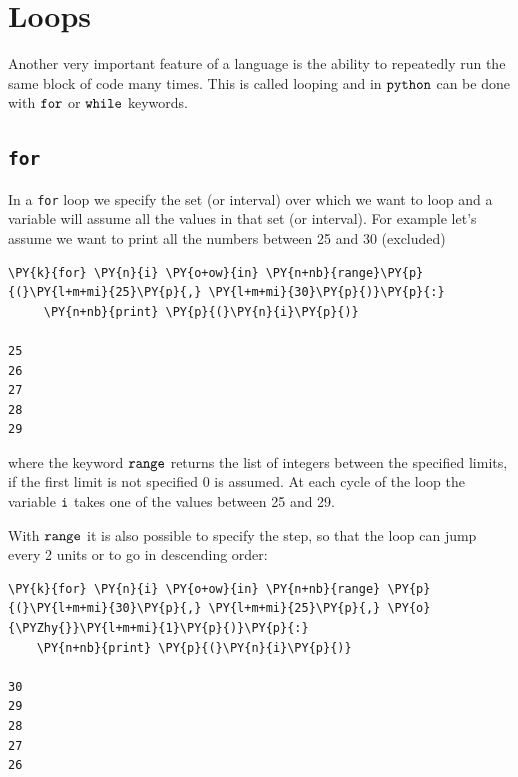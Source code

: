\section{Loops}\label{loops}

Another very important feature of a language is the ability to repeatedly run the same 
block of code many times. This is called looping and in \(\tt{python}\) can be done
 with $\tt{for}$ or $\tt{while}$ keywords.

\subsection{\texttt{for}}\label{for}

In a \texttt{for} loop we specify the set (or interval) over which we want to loop and a 
variable will assume all the values in that set (or interval). For example let's assume we 
want to print all the numbers between 25 and 30 (excluded) 

\begin{codebox}[breakable, size=fbox, boxrule=1pt, pad at break*=1mm, colback=cellbackground, colframe=cellborder]            
\begin{Verbatim}[commandchars=\\\{\}]
\PY{k}{for} \PY{n}{i} \PY{o+ow}{in} \PY{n+nb}{range}\PY{p}{(}\PY{l+m+mi}{25}\PY{p}{,} \PY{l+m+mi}{30}\PY{p}{)}\PY{p}{:}
     \PY{n+nb}{print} \PY{p}{(}\PY{n}{i}\PY{p}{)}

25
26
27
28
29
\end{Verbatim}
\end{codebox}
\noindent
where the keyword $\tt{range}$ returns the list of integers between the specified limits, 
if the first limit is not specified 0 is assumed.
At each cycle of the loop the variable $\tt{i}$ takes one of the values between
25 and 29. 

With $\tt{range}$ it is also possible to specify the step, so that the loop can jump every 2 units or to go in descending order:

\begin{codebox}[breakable, size=fbox, boxrule=1pt, pad at break*=1mm, colback=cellbackground, colframe=cellborder]            
\begin{Verbatim}[commandchars=\\\{\}]
\PY{k}{for} \PY{n}{i} \PY{o+ow}{in} \PY{n+nb}{range} \PY{p}{(}\PY{l+m+mi}{30}\PY{p}{,} \PY{l+m+mi}{25}\PY{p}{,} \PY{o}{\PYZhy{}}\PY{l+m+mi}{1}\PY{p}{)}\PY{p}{:}
    \PY{n+nb}{print} \PY{p}{(}\PY{n}{i}\PY{p}{)}

30
29
28
27
26
\end{Verbatim}
\end{codebox}

